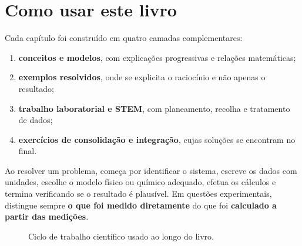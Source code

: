 \documentclass[11pt,a4paper,oneside]{book}
\begin{document}
\chapter*{Como usar este livro}
Cada capítulo foi construído em quatro camadas complementares:
\begin{enumerate}
  \item \textbf{conceitos e modelos}, com explicações progressivas e relações matemáticas;
  \item \textbf{exemplos resolvidos}, onde se explicita o raciocínio e não apenas o resultado;
  \item \textbf{trabalho laboratorial e STEM}, com planeamento, recolha e tratamento de dados;
  \item \textbf{exercícios de consolidação e integração}, cujas soluções se encontram no final.
\end{enumerate}

Ao resolver um problema, começa por identificar o sistema, escreve os dados com unidades, escolhe o modelo físico ou químico adequado, efetua os cálculos e termina verificando se o resultado é plausível. Em questões experimentais, distingue sempre \textbf{o que foi medido diretamente} do que foi \textbf{calculado a partir das medições}.

\begin{figure}[H]
\centering
{}
\caption{Ciclo de trabalho científico usado ao longo do livro.}
\end{figure}
\end{document}
